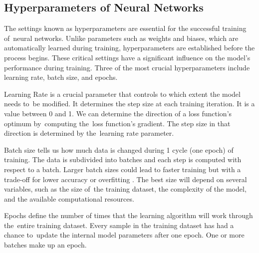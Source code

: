 \subsection{Hyperparameters of Neural Networks}
The settings known as hyperparameters are essential for the successful training of~neural networks. Unlike parameters such as weights and biases, which are automatically learned during training, hyperparameters are established before the process begins. These critical settings have a significant influence on the model's performance during training.  Three of the most crucial hyperparameters include learning rate, batch size, and epochs. 


	Learning Rate is a crucial parameter that controls to which extent the model needs to~be modified. It determines the step size at each training iteration. It is a value between 0 and 1. We can determine the direction of a loss function's optimum by~computing the~loss function's gradient. The step size in that direction is determined by the~learning rate parameter.
	
	Batch size tells us how much data is changed during 1 cycle (one epoch) of training. The data is subdivided into batches and each step is computed with respect to a batch. Larger batch sizes could lead to faster training but with a trade-off for lower accuracy or overfitting \cite{DBLP:journals/corr/abs-2006-08517}. The best size will depend on several variables, such as the size of~the training dataset, the complexity of the model, and the available computational resources.
	
	Epochs define the number of times that the learning algorithm will work through the~entire training dataset. Every sample in the training dataset has had a chance to~update the internal model parameters after one epoch. One or more batches make up an epoch.

